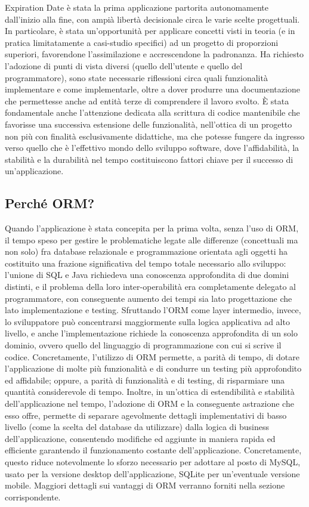 Expiration Date è stata la prima applicazione partorita autonomamente dall'inizio alla fine, con ampià libertà decisionale circa le varie scelte progettuali. In particolare, è stata un'opportunità per applicare concetti visti in teoria (e in pratica limitatamente a casi-studio specifici) ad un progetto di proporzioni superiori, favorendone l'assimilazione e accrescendone la padronanza. Ha richiesto l'adozione di punti di vista diversi (quello dell'utente e quello del programmatore), sono state necessarie riflessioni circa quali funzionalità implementare e come implementarle, oltre a dover produrre una documentazione che permettesse anche ad entità terze di comprendere il lavoro svolto. È stata fondamentale anche l'attenzione dedicata alla scrittura di codice mantenibile che favorisse una successiva estensione delle funzionalità, nell'ottica di un progetto non più con finalità esclusivamente didattiche, ma che potesse fungere da ingresso verso quello che è l'effettivo mondo dello sviluppo software, dove l'affidabilità, la stabilità e la durabilità nel tempo costituiscono fattori chiave per il successo di un'applicazione.

\subsection{Perché ORM?}

Quando l'applicazione è stata concepita per la prima volta, senza l'uso di ORM, il tempo speso per gestire le problematiche legate alle differenze (concettuali ma non solo) fra database relazionale e programmazione orientata agli oggetti ha costituito una frazione significativa del tempo totale necessario allo sviluppo: l'unione di SQL e Java richiedeva una conoscenza approfondita di due domini distinti, e il problema della loro inter-operabilità era completamente delegato al programmatore, con conseguente aumento dei tempi sia lato progettazione che lato implementazione e testing. Sfruttando l'ORM come layer intermedio, invece, lo sviluppatore può concentrarsi maggiormente sulla logica applicativa ad alto livello, e anche l'implementazione richiede la conoscenza approfondita di un solo dominio, ovvero quello del linguaggio di programmazione con cui si scrive il codice. Concretamente, l'utilizzo di ORM permette, a parità di tempo, di dotare l'applicazione di molte più funzionalità e di condurre un testing più approfondito ed affidabile; oppure, a parità di funzionalità e di testing, di risparmiare una quantità considerevole di tempo. Inoltre, in un'ottica di estendibilità e stabilità dell'applicazione nel tempo, l'adozione di ORM e la conseguente astrazione che esso offre, permette di separare agevolmente dettagli implementativi di basso livello (come la scelta del database da utilizzare) dalla logica di business dell'applicazione, consentendo modifiche ed aggiunte in maniera rapida ed efficiente garantendo il funzionamento costante dell'applicazione. Concretamente, questo riduce notevolmente lo sforzo necessario per adottare al posto di MySQL, usato per la versione desktop dell'applicazione, SQLite per un'eventuale versione mobile. Maggiori dettagli sui vantaggi di ORM verranno forniti nella sezione corrispondente. 
